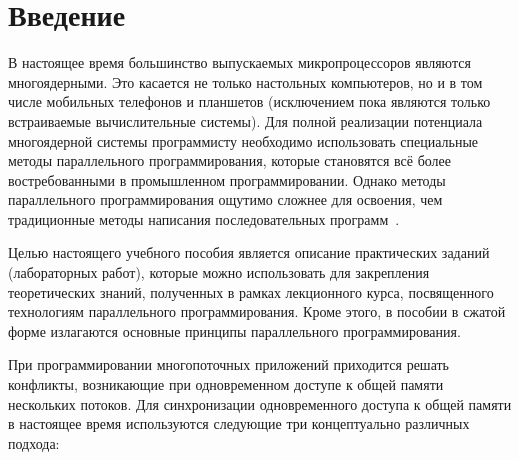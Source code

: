 \section*{Введение}

В настоящее время большинство выпускаемых микропроцессоров являются многоядерными.
Это касается не только настольных компьютеров, но и в том числе мобильных телефонов и планшетов (исключением пока являются только встраиваемые вычислительные системы).
Для полной реализации потенциала многоядерной системы программисту необходимо использовать специальные методы параллельного программирования, которые становятся всё более востребованными в промышленном программировании.
Однако методы параллельного программирования ощутимо сложнее для освоения, чем традиционные методы написания последовательных программ~\cite{Galiakhmetova2019}.

Целью настоящего учебного пособия является описание практических заданий (лабораторных работ), которые можно использовать для закрепления теоретических знаний, полученных в рамках лекционного курса, посвященного технологиям параллельного программирования. Кроме этого, в пособии в сжатой форме излагаются основные принципы параллельного программирования.%

При программировании многопоточных приложений приходится решать конфликты, возникающие при одновременном доступе к общей памяти нескольких потоков.
Для синхронизации одновременного доступа к общей памяти в настоящее время используются следующие три концептуально различных подхода:

